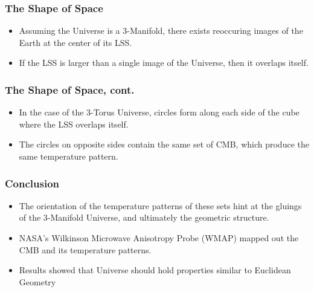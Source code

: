 \documentclass[13pt]{beamer}
\begin{document}
\begin{frame}
\frametitle{The Shape of Space}
  \begin{itemize}
    \item Assuming the Universe is a 3-Manifold, there exists reoccuring images of the Earth at the center of its LSS.
    \item If the LSS is larger than a single image of the Universe, then it overlaps itself.
  \end{itemize}

\end{frame}

\begin{frame}
\frametitle{The Shape of Space, cont.}
  \begin{itemize}
    \item In the case of the 3-Torus Universe, circles form along each side of the cube where the LSS overlaps itself.
    \item The circles on opposite sides contain the same set of CMB, which produce the same temperature pattern.
  \end{itemize}

\end{frame}

\begin{frame}
\frametitle{Conclusion}
  \begin{itemize}
    \item The orientation of the temperature patterns of these sets hint at the gluings of the 3-Manifold Universe, and ultimately the geometric structure.
    \item NASA's Wilkinson Microwave Anisotropy Probe (WMAP) mapped out the CMB and its temperature patterns.
    \item Results showed that Universe should hold properties similar to Euclidean Geometry
  \end{itemize}

\end{frame}
\end{document}
